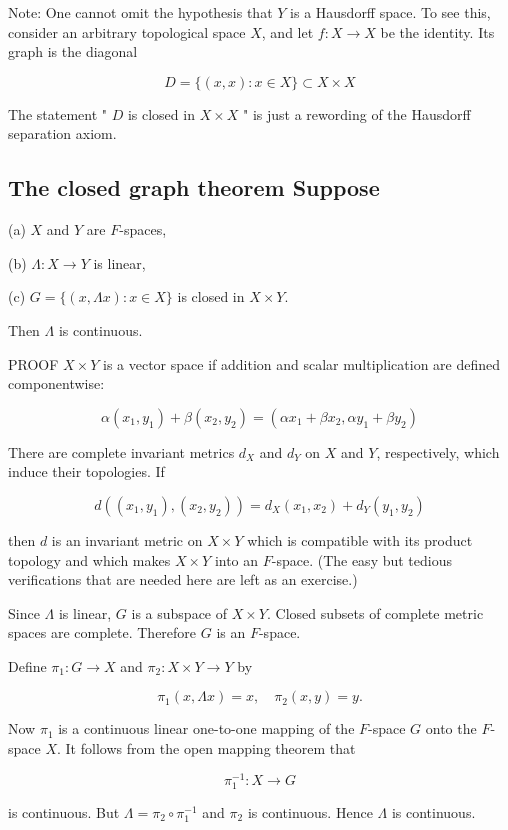 \documentclass[10pt]{article}
\begin{document}
Note: One cannot omit the hypothesis that $Y$ is a Hausdorff space. To see this, consider an arbitrary topological space $X$, and let $f: X \rightarrow X$ be the identity. Its graph is the diagonal

$$
D=\{(x, x): x \in X\} \subset X \times X
$$

The statement " $D$ is closed in $X \times X$ " is just a rewording of the Hausdorff separation
axiom.

\subsection{The closed graph theorem Suppose}
(a) $X$ and $Y$ are $F$-spaces,

(b) $\Lambda: X \rightarrow Y$ is linear,

(c) $G=\{(x, \Lambda x): x \in X\}$ is closed in $X \times Y$.

Then $\Lambda$ is continuous.

PROOF $X \times Y$ is a vector space if addition and scalar multiplication are defined componentwise:

$$
\alpha\left(x_{1}, y_{1}\right)+\beta\left(x_{2}, y_{2}\right)=\left(\alpha x_{1}+\beta x_{2}, \alpha y_{1}+\beta y_{2}\right)
$$

There are complete invariant metrics $d_{X}$ and $d_{Y}$ on $X$ and $Y$, respectively, which induce their topologies. If

$$
d\left(\left(x_{1}, y_{1}\right),\left(x_{2}, y_{2}\right)\right)=d_{X}\left(x_{1}, x_{2}\right)+d_{Y}\left(y_{1}, y_{2}\right)
$$

then $d$ is an invariant metric on $X \times Y$ which is compatible with its product topology and which makes $X \times Y$ into an $F$-space. (The easy but tedious verifications that are needed here are left as an exercise.)

Since $\Lambda$ is linear, $G$ is a subspace of $X \times Y$. Closed subsets of complete metric spaces are complete. Therefore $G$ is an $F$-space.

Define $\pi_{1}: G \rightarrow X$ and $\pi_{2}: X \times Y \rightarrow Y$ by

$$
\pi_{1}(x, \Lambda x)=x, \quad \pi_{2}(x, y)=y .
$$

Now $\pi_{1}$ is a continuous linear one-to-one mapping of the $F$-space $G$ onto the $F$-space $X$. It follows from the open mapping theorem that

$$
\pi_{1}^{-1}: X \rightarrow G
$$

is continuous. But $\Lambda=\pi_{2} \circ \pi_{1}^{-1}$ and $\pi_{2}$ is continuous. Hence $\Lambda$ is continuous.
\end{document}
